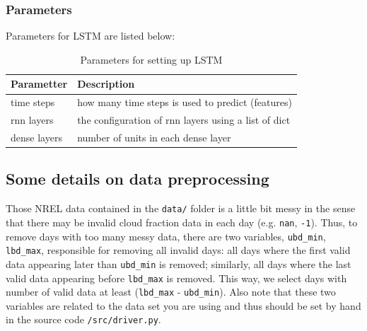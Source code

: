 \documentclass[11pt]{article}
\begin{document}
\subsubsection{Parameters}
\label{sec-3-2-2}

Parameters for LSTM are listed below:
\begin{table}[htb]
\caption{Parameters for setting up LSTM}
\centering
\begin{tabular}{ll}
\toprule
Parametter & Description\\
\midrule
time steps & how many time steps is used to predict (features)\\
rnn layers & the configuration of rnn layers using a list of dict\\
dense layers & number of units in each dense layer\\
\bottomrule
\end{tabular}
\end{table}

\subsection{Some details on data preprocessing}
\label{sec-3-3}
Those NREL data contained in the \texttt{data/} folder is a little bit messy
in the sense that there may be invalid cloud fraction data in each day
(e.g. \texttt{nan}, \texttt{-1}). Thus, to remove days with too many messy data,
there are two variables, \texttt{ubd\_min}, \texttt{lbd\_max}, responsible for
removing all invalid days: all days where the first valid data
appearing later than \texttt{ubd\_min} is removed; similarly, all days where
the last valid data appearing before \texttt{lbd\_max} is removed. This way,
we select days with number of valid data at least (\texttt{lbd\_max} -
\texttt{ubd\_min}). Also note that these two variables are related to the data
set you are using and thus should be set by hand in the source code
\texttt{/src/driver.py}.
\end{document}
